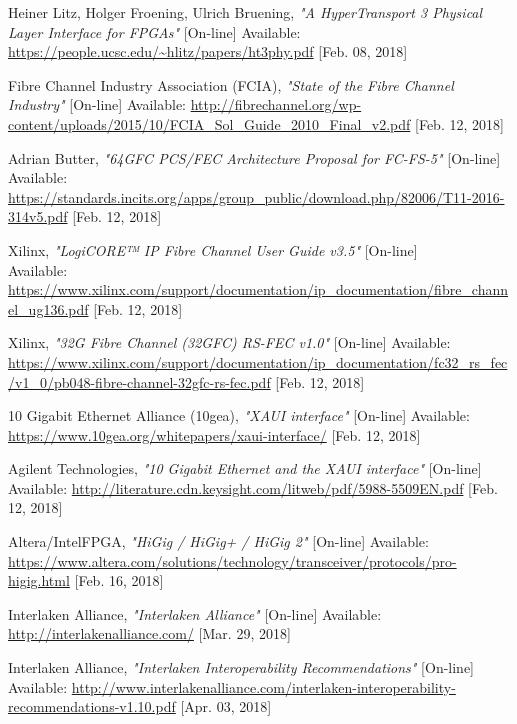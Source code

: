 \begin{thebibliography}{9}
	Heiner Litz, Holger Froening, Ulrich Bruening,
	\textit{"A HyperTransport 3 Physical Layer Interface for FPGAs"}
	[On-line] Available:
	\url{https://people.ucsc.edu/~hlitz/papers/ht3phy.pdf} [Feb. 08, 2018]

	Fibre Channel Industry Association (FCIA),
	\textit{"State of the Fibre Channel Industry"}
	[On-line] Available:
	\url{http://fibrechannel.org/wp-content/uploads/2015/10/FCIA_Sol_Guide_2010_Final_v2.pdf} [Feb. 12, 2018]

	Adrian Butter,
	\textit{"64GFC PCS/FEC Architecture Proposal for FC-FS-5"}
	[On-line] Available:
	\url{https://standards.incits.org/apps/group_public/download.php/82006/T11-2016-314v5.pdf} [Feb. 12, 2018]
	
	Xilinx,
	\textit{"LogiCORE™ IP Fibre Channel User Guide v3.5"}
	[On-line] \\ Available:
	\url{https://www.xilinx.com/support/documentation/ip_documentation/fibre_channel_ug136.pdf} [Feb. 12, 2018]	

	Xilinx,
	\textit{"32G Fibre Channel (32GFC) RS-FEC v1.0"}
	[On-line] Available:
	\url{https://www.xilinx.com/support/documentation/ip_documentation/fc32_rs_fec/v1_0/pb048-fibre-channel-32gfc-rs-fec.pdf} [Feb. 12, 2018]	

	10 Gigabit Ethernet Alliance (10gea),
	\textit{"XAUI interface"}
	[On-line] Available:
	\url{https://www.10gea.org/whitepapers/xaui-interface/} [Feb. 12, 2018]
	
	Agilent Technologies,
	\textit{"10 Gigabit Ethernet and the XAUI interface"}
	[On-line] Available:
	\url{http://literature.cdn.keysight.com/litweb/pdf/5988-5509EN.pdf} [Feb. 12, 2018]	
	
	Altera/IntelFPGA,
	\textit{"HiGig / HiGig+ / HiGig 2"}
	[On-line] Available:
	\url{https://www.altera.com/solutions/technology/transceiver/protocols/pro-higig.html} [Feb. 16, 2018]	

	Interlaken Alliance,
	\textit{"Interlaken Alliance"}
	[On-line] Available:
	\url{http://interlakenalliance.com/} [Mar. 29, 2018]
	
	Interlaken Alliance,
	\textit{"Interlaken Interoperability Recommendations"}
	[On-line] Available:
	\url{http://www.interlakenalliance.com/interlaken-interoperability-recommendations-v1.10.pdf} [Apr. 03, 2018] 


\end{thebibliography}
